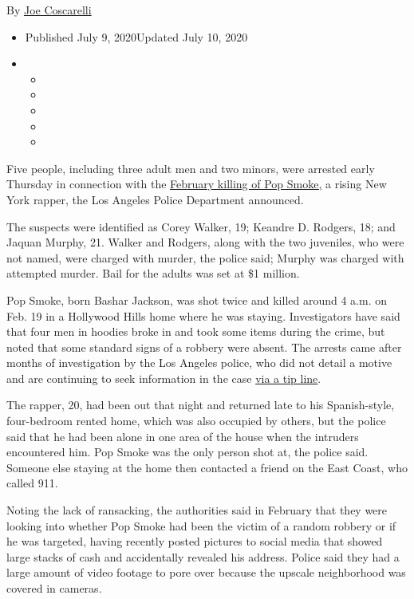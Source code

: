 By \href{https://www.nytimes3xbfgragh.onion/by/joe-coscarelli}{Joe
Coscarelli}

\begin{itemize}
\item
  Published July 9, 2020Updated July 10, 2020
\item
  \begin{itemize}
  \item
  \item
  \item
  \item
  \item
  \end{itemize}
\end{itemize}

Five people, including three adult men and two minors, were arrested
early Thursday in connection with the
\href{https://www.nytimes3xbfgragh.onion/2020/02/19/arts/music/pop-smoke-dead.html}{February
killing of Pop Smoke,} a rising New York rapper, the Los Angeles Police
Department announced.

The suspects were identified as Corey Walker, 19; Keandre D. Rodgers,
18; and Jaquan Murphy, 21. Walker and Rodgers, along with the two
juveniles, who were not named, were charged with murder, the police
said; Murphy was charged with attempted murder. Bail for the adults was
set at \$1 million.

Pop Smoke, born Bashar Jackson, was shot twice and killed around 4 a.m.
on Feb. 19 in a Hollywood Hills home where he was staying. Investigators
have said that four men in hoodies broke in and took some items during
the crime, but noted that some standard signs of a robbery were absent.
The arrests came after months of investigation by the Los Angeles
police, who did not detail a motive and are continuing to seek
information in the case
\href{https://twitter.com/LAPDHQ/status/1281434259245264897}{via a tip
line}.

The rapper, 20, had been out that night and returned late to his
Spanish-style, four-bedroom rented home, which was also occupied by
others, but the police said that he had been alone in one area of the
house when the intruders encountered him. Pop Smoke was the only person
shot at, the police said. Someone else staying at the home then
contacted a friend on the East Coast, who called 911.

Noting the lack of ransacking, the authorities said in February that
they were looking into whether Pop Smoke had been the victim of a random
robbery or if he was targeted, having recently posted pictures to social
media that showed large stacks of cash and accidentally revealed his
address. Police said they had a large amount of video footage to pore
over because the upscale neighborhood was covered in cameras.

